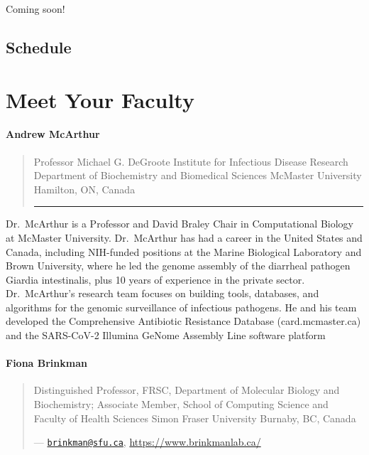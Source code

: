 \documentclass[
]{book}
\begin{document}
Coming soon!

\section{Schedule}\label{schedule}

\chapter{Meet Your Faculty}\label{meet-your-faculty}

\subsubsection{Andrew McArthur}\label{andrew-mcarthur}

\begin{quote}
Professor Michael G. DeGroote Institute for Infectious Disease
Research Department of Biochemistry and Biomedical Sciences
McMaster University Hamilton, ON, Canada

\begin{center}\rule{0.5\linewidth}{0.5pt}\end{center}
\end{quote}

Dr.~McArthur is a Professor and David Braley Chair in Computational
Biology at McMaster University. Dr.~McArthur has had a career in the
United States and Canada, including NIH-funded positions at the Marine
Biological Laboratory and Brown University, where he led the genome
assembly of the diarrheal pathogen Giardia intestinalis, plus 10 years
of experience in the private sector. Dr.~McArthur's research team
focuses on building tools, databases, and algorithms for the genomic
surveillance of infectious pathogens. He and his team developed the
Comprehensive Antibiotic Resistance Database (card.mcmaster.ca) and the
SARS-CoV-2 Illumina GeNome Assembly Line software platform

\subsubsection{Fiona Brinkman}\label{fiona-brinkman}

\begin{quote}
Distinguished Professor, FRSC, Department of Molecular Biology and
Biochemistry; Associate Member, School of Computing Science and
Faculty of Health Sciences Simon Fraser University Burnaby,
BC, Canada

--- \href{mailto:brinkman@sfu.ca}{\nolinkurl{brinkman@sfu.ca}},
\url{https://www.brinkmanlab.ca/}
\end{quote}
\end{document}
